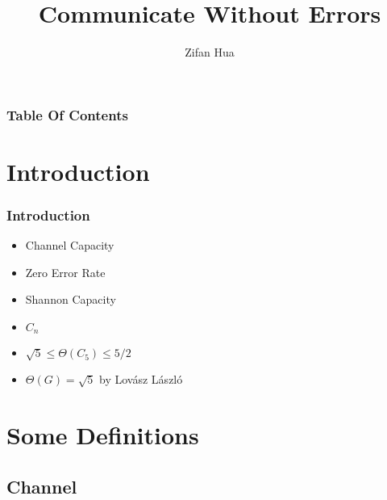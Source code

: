 \documentclass{beamer}
\title{Communicate Without Errors}
\author{Zifan Hua}
\begin{document}
      \frame{\titlepage}

      \begin{frame}
            \frametitle[TOC]{Table Of Contents}
            \tableofcontents
      \end{frame}

      \section{Introduction}

      \begin{frame}
            \frametitle{Introduction}
            \begin{itemize}
                  \item Channel Capacity
                  \item Zero Error Rate
                  \item Shannon Capacity
                  \item $C_{n}$
                  \item $\sqrt{5} \le \Theta(C_{5}) \le 5/2$
                  \item $\Theta(G) = \sqrt{5}$ by Lovász László
            \end{itemize}
      \end{frame}

      \section{Some Definitions}

            \subsection{Channel}
\end{document}
